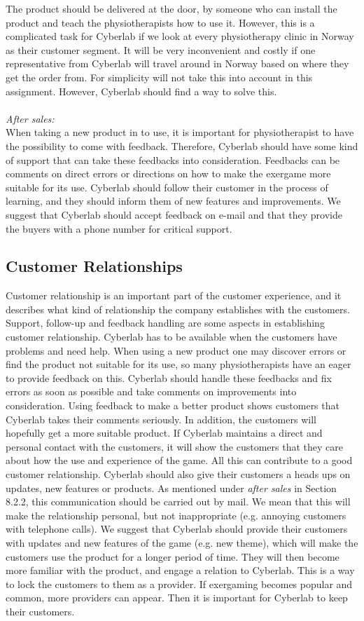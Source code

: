 The product should be delivered at the door, by someone who can install the product and teach the physiotherapists how to use it. However, this is a complicated task for Cyberlab if we look at every physiotherapy clinic in Norway as their customer segment. It will be very inconvenient and costly if  one representative from Cyberlab will travel around in Norway based on where they get the order from. For simplicity will not take this into account in this assignment. However, Cyberlab should find a way to solve this. \\ \\
\emph{After sales:}\\
When taking a new product in to use, it is important for physiotherapist to have the possibility to come with feedback. Therefore, Cyberlab should have some kind of support that can take these feedbacks into consideration. Feedbacks can be comments on direct errors or directions on how to make the exergame more suitable for its use. Cyberlab should follow their customer in the process of learning, and they should inform them of new features and improvements. We suggest that Cyberlab should accept feedback on e-mail and that they provide the buyers with a phone number for critical support.  
\subsection{Customer Relationships}
Customer relationship is an important part of the customer experience, and it describes what kind of relationship the company establishes with the customers. Support, follow-up and feedback handling are some aspects in establishing customer relationship. Cyberlab has to be available when the customers have problems and need help. When using a new product one may discover errors or find the product not suitable for its use, so many physiotherapists have an eager to provide feedback on this. Cyberlab should handle these feedbacks and fix errors as soon as possible and take comments on improvements into consideration. Using feedback to make a better product shows customers that Cyberlab takes their comments seriously.  In addition, the customers will hopefully get a more suitable product.  If Cyberlab maintains a direct and personal contact with the customers, it will show the customers that they care about how the use and experience of the game.  All this can contribute to a good customer relationship. Cyberlab should also give their customers a heads ups on updates, new features or products. As mentioned under \emph{after sales} in Section 8.2.2, this communication should be carried out by mail. We mean that this will make the relationship personal, but not inappropriate (e.g. annoying customers with telephone calls). We suggest that Cyberlab should provide their customers with updates and new features of the game (e.g. new theme), which will make the customers use the product for a longer period of time. They will then become more familiar with the product, and engage a relation to Cyberlab. This is a way to lock the customers to them as a provider. If exergaming becomes popular and common, more providers can appear. Then it is important for Cyberlab to keep their customers. 

